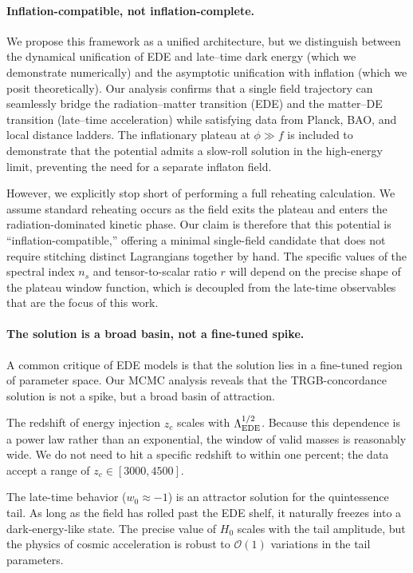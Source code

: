 \documentclass[a4paper,11pt]{article}
\begin{document}
\paragraph{Inflation-compatible, not inflation-complete.}
We propose this framework as a unified architecture, but we distinguish between the dynamical unification of EDE and late--time dark energy (which we demonstrate numerically) and the asymptotic unification with inflation (which we posit theoretically). Our analysis confirms that a single field trajectory can seamlessly bridge the radiation--matter transition (EDE) and the matter--DE transition (late--time acceleration) while satisfying data from Planck, BAO, and local distance ladders. The inflationary plateau at $\phi \gg f$ is included to demonstrate that the potential admits a slow-roll solution in the high-energy limit, preventing the need for a separate inflaton field.

However, we explicitly stop short of performing a full reheating calculation. We assume standard reheating occurs as the field exits the plateau and enters the radiation-dominated kinetic phase. Our claim is therefore that this potential is ``inflation-compatible,'' offering a minimal single-field candidate that does not require stitching distinct Lagrangians together by hand. The specific values of the spectral index $n_s$ and tensor-to-scalar ratio $r$ will depend on the precise shape of the plateau window function, which is decoupled from the late-time observables that are the focus of this work.

\paragraph{The solution is a broad basin, not a fine-tuned spike.}
A common critique of EDE models is that the solution lies in a fine-tuned region of parameter space. Our MCMC analysis reveals that the TRGB-concordance solution is not a spike, but a broad basin of attraction.

The redshift of energy injection $z_c$ scales with $\Lambda_{\rm EDE}^{1/2}$. Because this dependence is a power law rather than an exponential, the window of valid masses is reasonably wide. We do not need to hit a specific redshift to within one percent; the data accept a range of $z_c \in [3000, 4500]$.

The late-time behavior ($w_0 \approx -1$) is an attractor solution for the quintessence tail. As long as the field has rolled past the EDE shelf, it naturally freezes into a dark-energy-like state. The precise value of $H_0$ scales with the tail amplitude, but the physics of cosmic acceleration is robust to $\mathcal{O}(1)$ variations in the tail parameters.
\end{document}
